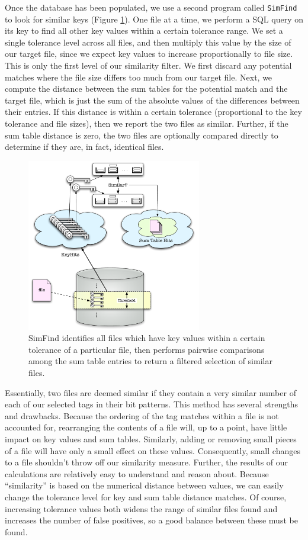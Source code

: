 \documentclass[10pt, twocolumn]{article}
\begin{document}
Once the database has been populated, we use a second program called {\tt SimFind} to look for similar keys (Figure \ref{simFind}).  One file at a time, we perform a SQL query on its key to find all other key values within a certain tolerance range.  We set a single tolerance level across all files, and then multiply this value by the size of our target file, since we expect key values to increase proportionally to file size.  This is only the first level of our similarity filter.  We first discard any potential matches where the file size differs too much from our target file.  Next, we compute the distance between the sum tables for the potential match and the target file, which is just the sum of the absolute values of the differences between their entries.  If this distance is within a certain tolerance (proportional to the key tolerance and file sizes), then we report the two files as similar.  Further, if the sum table distance is zero, the two files are optionally compared directly to determine if they are, in fact, identical files.

 \begin{figure}[h] 
 \centering
\includegraphics[width= 3in]{simFind.pdf}
\caption{SimFind identifies all files which have key values within a certain tolerance of a particular file, then performs pairwise comparisons among the sum table entries to return a filtered selection of similar files.}
\label{simFind} 
\end{figure}   

Essentially, two files are deemed similar if they contain a very similar number of each of our selected tags in their bit patterns.  This method has several strengths and drawbacks.  Because the ordering of the tag matches within a file is not accounted for, rearranging the contents of a file will, up to a point, have little impact on key values and sum tables.  Similarly, adding or removing small pieces of a file will have only a small effect on these values.  Consequently, small changes to a file shouldn't throw off our similarity measure.  Further, the results of our calculations are relatively easy to understand and reason about.  Because ``similarity'' is based on the numerical distance between values, we can easily change the tolerance level for key and sum table distance matches.  Of course, increasing tolerance values both widens the range of similar files found and increases the number of false positives, so a good balance between these must be found.
\end{document}
